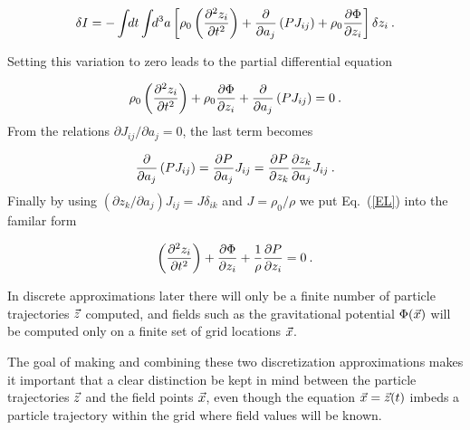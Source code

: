 \begin{equation}
    \delta I = -\int\!\! dt \int\!\! d^3a \left[ \rho_0
    \left(\frac{\partial^2 z_i}{\partial t^2}\right)
    + \frac{\partial}{\partial
    a_j}\left(P J_{ij}\right)
    + \rho_0 \frac{\partial \Phi}{\partial z_i}
    \right] \delta z_i \: .
\end{equation}

Setting this variation to zero leads to the partial differential equation

\begin{equation}\label{EL}
    \rho_0 \left(\frac{\partial^2 z_i}{\partial t^2}\right) + \rho_0
    \frac{\partial \Phi}{\partial z_i} + \frac{\partial}{\partial
    a_j}\left(P J_{ij}\right) = 0 \: .
\end{equation}
%
From the relations ${\partial J_{ij}}/{\partial a_j} = 0$, the last term becomes

\begin{equation}
    \frac{\partial}{\partial a_j}\left(P  J_{ij} \right) =
    \frac{\partial P}{\partial a_j} J_{ij} = \frac{\partial P}{\partial
    z_k}\frac{\partial z_k}{\partial a_j} J_{ij} \: .
\end{equation}
%
Finally by using $({\partial z_k}/{\partial a_j}) J_{ij} = J \delta_{ik}$ and
$J = \rho_0 / \rho$ we put Eq.~(\ref{EL}) into the familar form

\begin{equation}\label{eq:Euler}
    \left(\frac{\partial^2 z_i}{\partial t^2}\right) + \frac{\partial
    \Phi}{\partial z_i} + \frac{1}{\rho} \frac{\partial P}{\partial z_i} =
    0 \: .
\end{equation}



In discrete approximations later there will only be a finite number of particle
trajectories ${\vec z}$ computed, and fields such as the gravitational potential
$\Phi({\vec x})$ will be computed only on a finite set of grid locations ${\vec x}$.

The goal of making and combining these two discretization approximations makes
it important that a clear distinction be kept in mind between the particle
trajectories ${\vec z}$ and the field points ${\vec x}$, even though the equation
${\vec x} = {\vec z}(t)$ imbeds a particle trajectory within the grid where field values
will be known.

